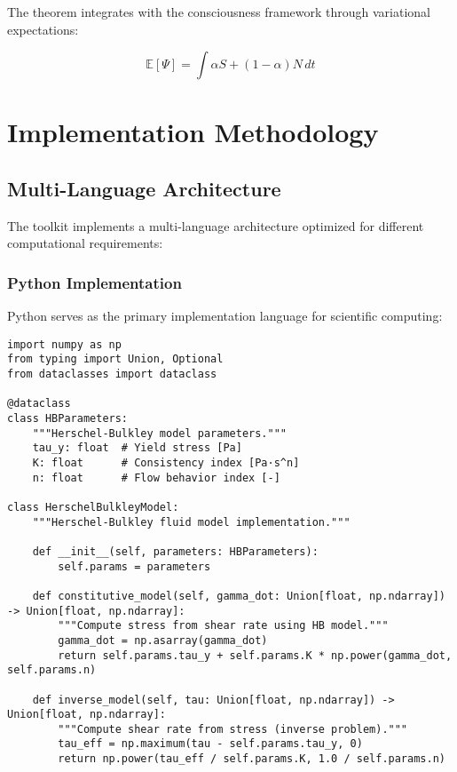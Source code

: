 \documentclass[11pt,a4paper]{article}
\begin{document}
The theorem integrates with the consciousness framework through variational expectations:

\begin{equation}
\mathbb{E}[\Psi] = \int \alpha S + (1-\alpha)N \, dt
\label{eq:variational_psi}
\end{equation}

\section{Implementation Methodology}
\label{sec:methodology}

\subsection{Multi-Language Architecture}
\label{subsec:multi_language}

The toolkit implements a multi-language architecture optimized for different computational requirements:

\subsubsection{Python Implementation}
\label{subsubsec:python_implementation}

Python serves as the primary implementation language for scientific computing:

\begin{lstlisting}[caption=Python Implementation of HB Model]
import numpy as np
from typing import Union, Optional
from dataclasses import dataclass

@dataclass
class HBParameters:
    """Herschel-Bulkley model parameters."""
    tau_y: float  # Yield stress [Pa]
    K: float      # Consistency index [Pa·s^n]
    n: float      # Flow behavior index [-]

class HerschelBulkleyModel:
    """Herschel-Bulkley fluid model implementation."""

    def __init__(self, parameters: HBParameters):
        self.params = parameters

    def constitutive_model(self, gamma_dot: Union[float, np.ndarray]) -> Union[float, np.ndarray]:
        """Compute stress from shear rate using HB model."""
        gamma_dot = np.asarray(gamma_dot)
        return self.params.tau_y + self.params.K * np.power(gamma_dot, self.params.n)

    def inverse_model(self, tau: Union[float, np.ndarray]) -> Union[float, np.ndarray]:
        """Compute shear rate from stress (inverse problem)."""
        tau_eff = np.maximum(tau - self.params.tau_y, 0)
        return np.power(tau_eff / self.params.K, 1.0 / self.params.n)
\end{lstlisting}
\end{document}
